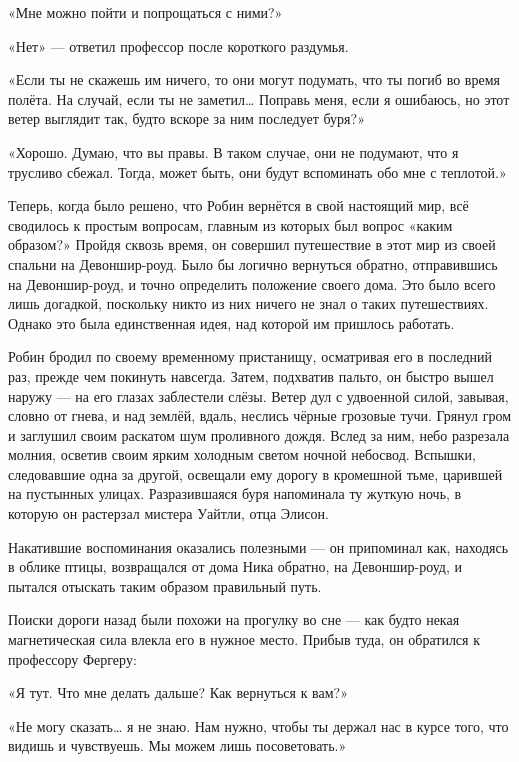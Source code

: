 \documentclass[a4paper,12pt]{book}
\begin{document}
\par
«Мне можно пойти и попрощаться с ними?»
\par
«Нет» — ответил профессор после короткого раздумья.
\par
«Если ты не скажешь им ничего, то они могут подумать, что ты погиб во время полёта. На случай, если ты не заметил… Поправь меня, если я ошибаюсь, но этот ветер выглядит так, будто вскоре за ним последует буря?»
\par
«Хорошо. Думаю, что вы правы. В таком случае, они не подумают, что я трусливо сбежал. Тогда, может быть, они будут вспоминать обо мне с теплотой.»\\
\par
Теперь, когда было решено, что Робин вернётся в свой настоящий мир, всё сводилось к простым вопросам, главным из которых был вопрос «каким образом?» Пройдя сквозь время, он совершил путешествие в этот мир из своей спальни на Девоншир-роуд. Было бы логично вернуться обратно, отправившись на Девоншир-роуд, и точно определить положение своего дома. Это было всего лишь догадкой, поскольку никто из них ничего не знал о таких путешествиях. Однако это была единственная идея, над которой им пришлось работать.
\par
Робин бродил по своему временному пристанищу, осматривая его в последний раз, прежде чем покинуть навсегда. Затем, подхватив пальто, он быстро вышел наружу — на его глазах заблестели слёзы. Ветер дул с удвоенной силой, завывая, словно от гнева, и над землёй, вдаль, неслись чёрные грозовые тучи. Грянул гром и заглушил своим раскатом шум проливного дождя. Вслед за ним, небо разрезала молния, осветив своим ярким холодным светом ночной небосвод. Вспышки, следовавшие одна за другой, освещали ему дорогу в кромешной тьме, царившей на пустынных улицах. Разразившаяся буря напоминала ту жуткую ночь, в которую он растерзал мистера Уайтли, отца Элисон.
\par
Накатившие воспоминания оказались полезными — он припоминал как, находясь в облике птицы, возвращался от дома Ника обратно, на Девоншир-роуд, и пытался отыскать таким образом правильный путь.
\par
Поиски дороги назад были похожи на прогулку во сне — как будто некая магнетическая сила влекла его в нужное место. Прибыв туда, он обратился к профессору Фергеру:
\par
«Я тут. Что мне делать дальше? Как вернуться к вам?»
\par
«Не могу сказать… я не знаю. Нам нужно, чтобы ты держал нас в курсе того, что видишь и чувствуешь. Мы можем лишь посоветовать.»
\end{document}
